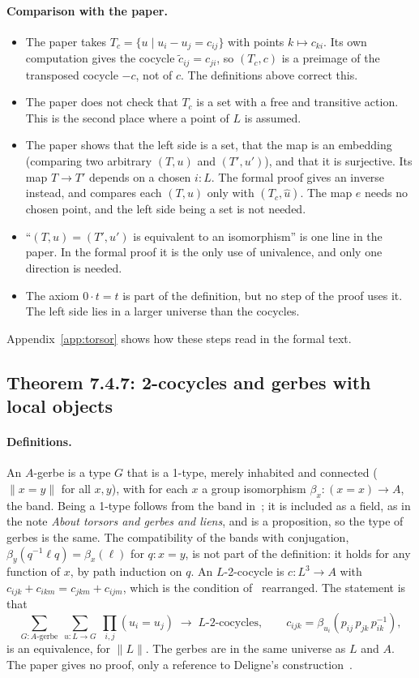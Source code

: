 \documentclass[11pt]{article}
\newcommand{\tr}[1]{\lVert #1\rVert}
\theoremstyle{remark}
\begin{document}
\paragraph{Comparison with the paper.}
\begin{itemize}
\item The paper takes $T_c=\{u\mid u_i-u_j=c_{ij}\}$ with points
  $k\mapsto c_{ki}$. Its own computation gives the cocycle
  $\tilde c_{ij}=c_{ji}$, so $(T_c,c)$ is a preimage of the transposed
  cocycle $-c$, not of $c$. The definitions above correct this.
\item The paper does not check that $T_c$ is a set with a free and
  transitive action. This is the second place where a point of $L$ is
  assumed.
\item The paper shows that the left side is a set, that the map is an
  embedding (comparing two arbitrary $(T,u)$ and $(T',u')$), and that it
  is surjective. Its map $T\to T'$ depends on a chosen $i:L$. The formal
  proof gives an inverse instead, and compares each $(T,u)$ only with
  $(T_c,\hat u)$. The map $e$ needs no chosen point, and the left side
  being a set is not needed.
\item ``$(T,u)=(T',u')$ is equivalent to an isomorphism'' is one line in
  the paper. In the formal proof it is the only use of univalence, and
  only one direction is needed.
\item The axiom $0\cdot t=t$ is part of the definition, but no step of
  the proof uses it. The left side lies in a larger universe than the
  cocycles.
\end{itemize}
Appendix~\ref{app:torsor} shows how these steps read in the formal text.

\subsection*{Theorem 7.4.7: 2-cocycles and gerbes with local objects}

\paragraph{Definitions.} An $A$-gerbe is a type $G$ that is a 1-type,
merely inhabited and connected ($\tr{x=y}$ for all $x,y$), with for each
$x$ a group isomorphism $\beta_x:(x=x)\to A$, the band. Being a 1-type
follows from the band in~\cite{SAG}; it is included as a field, as in
the note \emph{About torsors and gerbes and liens}, and is a proposition, so the type
of gerbes is the same. The compatibility of the bands with conjugation,
$\beta_y(q^{-1}\ell q)=\beta_x(\ell)$ for $q:x=y$, is not part of the
definition: it holds for any function of $x$, by path induction on $q$.
An $L$-2-cocycle is $c:L^3\to A$ with
$c_{ijk}+c_{ikm}=c_{jkm}+c_{ijm}$, which is the condition of~\cite{SAG}
rearranged. The statement is that
\[
  \textstyle\sum_{G:A\text{-gerbe}}\ \sum_{u:L\to G}\ \prod_{i,j}(u_i=u_j)
  \;\longrightarrow\; L\text{-2-cocycles},\qquad
  c_{ijk}=\beta_{u_i}(p_{ij}\,p_{jk}\,p_{ik}^{-1}),
\]
is an equivalence, for $\tr{L}$. The gerbes are in the same universe as
$L$ and $A$. The paper gives no proof, only a reference to Deligne's
construction~\cite[5.3]{Deligne}.
\end{document}
